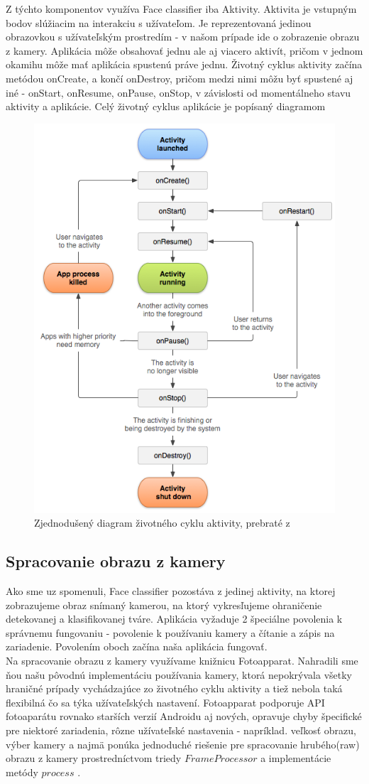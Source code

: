 \indent Z týchto komponentov využíva Face classifier iba Aktivity.
Aktivita je vstupným bodov slúžiacim na interakciu s užívateľom.
Je reprezentovaná jedinou obrazovkou s užívateľským prostredím - v našom prípade ide o zobrazenie obrazu z kamery. 
Aplikácia môže obsahovať jednu ale aj viacero aktivít, pričom v jednom okamihu môže mať aplikácia spustenú práve jednu.
Životný cyklus aktivity začína metódou onCreate, a končí onDestroy, pričom medzi nimi môžu byť spustené aj iné - onStart, onResume, onPause, onStop, v závislosti od momentálneho stavu aktivity a aplikácie.
Celý životný cyklus aplikácie je popísaný diagramom 
\begin{figure}[H]
	\centering
	\includegraphics[width=.5\linewidth]{img/activity_lifecycle}
	\caption{Zjednodušený diagram životného cyklu aktivity, prebraté z \cite{Understa46}}
	\label{fig:activity_lifecycle}
\end{figure}

\subsection{Spracovanie obrazu z kamery}
Ako sme uz spomenuli, Face classifier pozostáva z jedinej aktivity, na ktorej zobrazujeme obraz snímaný kamerou, na ktorý vykresľujeme ohraničenie detekovanej a klasifikovanej tváre.
Aplikácia vyžaduje 2 špeciálne povolenia k správnemu fungovaniu - povolenie k používaniu kamery a čítanie a zápis na zariadenie.
Povolením oboch začína naša aplikácia fungovať. \\

\indent Na spracovanie obrazu z kamery využívame knižnicu Fotoapparat.
Nahradili sme ňou našu pôvodnú implementáciu používania kamery, ktorá nepokrývala všetky hraničné prípady vychádzajúce zo životného cyklu aktivity a tiež nebola taká flexibilná čo sa týka užívateľských nastavení.
Fotoapparat podporuje API fotoaparátu rovnako starších verzií Androidu aj nových,
opravuje chyby špecifické pre niektoré zariadenia, rôzne užívateľské nastavenia - napríklad. veľkosť obrazu, výber kamery a najmä ponúka jednoduché riešenie pre spracovanie hrubého(raw) obrazu z kamery prostredníctvom triedy $ FrameProcessor $ a implementácie metódy $ process $ \cite{Fotoappa49}. \\

